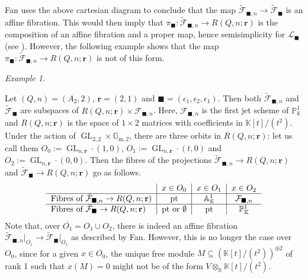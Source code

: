 \documentclass[11pt,english]{article}
\numberwithin{equation}{section}
\numberwithin{figure}{section}
\theoremstyle{definition}
\theoremstyle{plain}
\theoremstyle{remark}
\newtheorem{exmp}[df]{Example}
\DeclareMathOperator{\GL}{GL}
\newcommand\rr{\mathbf{r}}
\newcommand\KK{\mathbb{K}}
\begin{document}
Fan uses the above cartesian diagram to conclude that the map $\tilde{\mathcal{F}}_{\blacksquare,n}\rightarrow\tilde{\mathcal{F}}_{\blacksquare}$
is an affine fibration. This would then imply that $\pi_{\blacksquare}:\tilde{\mathcal{F}}_{\blacksquare,n}\rightarrow R(Q,n;\rr)$
is the composition of an affine fibration and a proper map, hence
semisimplicity for $\mathcal{L}_{\blacksquare}$ (see \cite[\S 8.1.6.]{Lus10}).
However, the following example shows that the map $\pi_{\blacksquare}:\tilde{\mathcal{F}}_{\blacksquare,n}\rightarrow R(Q,n;\rr)$
is not of this form.

\begin{exmp} \label{Exmp/A2}

Let $(Q,n)=(A_{2},2)$, $\rr=(2,1)$ and $\blacksquare=(\epsilon_{1},\epsilon_{2},\epsilon_{1})$.
Then both $\tilde{\mathcal{F}}_{\blacksquare,n}$ and $\tilde{\mathcal{F}}_{\blacksquare}$
are subspaces of $R(Q,n;\rr)\times\mathcal{F}_{\blacksquare,n}$.
Here, $\mathcal{F}_{\blacksquare,n}$ is the first jet scheme of $\mathbb{P}_{\KK}^{1}$
and $R(Q,n;\rr)$ is the space of $1\times2$ matrices with coefficients
in $\KK[t]/(t^{2})$. Under the action of $\GL_{2,2}\times\mathbb{G}_{\mathrm{m},2}$,
there are three orbits in $R(Q,n;\rr)$: let us call them $O_{0}:=\GL_{n,\rr}\cdot(1,0)$,
$O_{1}:=\GL_{n,\rr}\cdot(t,0)$ and $O_{2}:=\GL_{n,\rr}\cdot(0,0)$.
Then the fibres of the projections $\tilde{\mathcal{F}}_{\blacksquare,n}\rightarrow R(Q,n;\rr)$
and $\tilde{\mathcal{F}}_{\blacksquare}\rightarrow R(Q,n;\rr)$ go
as follows.\[
\begin{tabular}{l|c|c|c}
& $x\in O_0$ & $x\in O_1$ & $x\in O_2$ \\
\hline
$\text{Fibres of }\tilde{\mathcal{F}}_{\blacksquare,n}\rightarrow R(Q,n;\rr)$ & $\mathrm{pt}$ & $\mathbb{A}_{\KK}^1$ & $\mathcal{F}_{\blacksquare,n}$ \\
\hline
$\text{Fibres of }\tilde{\mathcal{F}}_{\blacksquare}\rightarrow R(Q,n;\rr)$ & $\mathrm{pt}\text{ or }\emptyset$ & $\mathrm{pt}$ & $\mathbb{P}_{\KK}^1$
\end{tabular}
\]Note that, over $\overline{O_{1}}=O_{1}\cup O_{2}$, there is indeed
an affine fibration $\tilde{\mathcal{F}}_{\blacksquare,n}\vert_{\overline{O_{1}}}\rightarrow\tilde{\mathcal{F}}_{\blacksquare}\vert_{\overline{O_{1}}}$
as described by Fan. However, this is no longer the case over $O_{0}$,
since for a given $x\in O_{0}$, the unique free module $M\subseteq(\KK[t]/(t^{2}))^{\oplus2}$
of rank 1 such that $x(M)=0$ might not be of the form $V\otimes_{\KK}\KK[t]/(t^{2})$.

\end{exmp}
\end{document}
